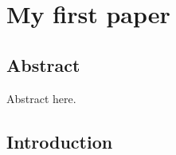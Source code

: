 \cleardoubleevenemptypage
\chapter{My first paper}
\clearpage

\section*{Abstract}
Abstract here.

\cleardoublepage

\section{Introduction}
\lipsum
